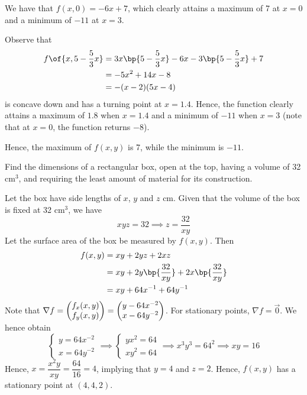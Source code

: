 \documentclass{echw}
\begin{document}
         We have that $f(x, 0) = -6x + 7$, which clearly attains a maximum of 7 at $x = 0$ and a minimum of $-11$ at $x = 3$.

         Observe that
        \begin{align*}
            f\of{x, 5 - \dfrac53 x} &= 3x\bp{5 - \dfrac53 x} - 6x - 3\bp{5 - \dfrac53 x} + 7\\
            &= -5x^2 + 14x - 8\\
            &= -(x-2)(5x-4)
        \end{align*}
        is concave down and has a turning point at $x = 1.4$. Hence, the function clearly attains a maximum of $1.8$ when $x = 1.4$ and a minimum of $-11$ when $x = 3$ (note that at $x = 0$, the function returns $-8$). 

        Hence, the maximum of $f(x, y)$ is 7, while the minimum is $-11$.


    \problem{}
        Find the dimensions of a rectangular box, open at the top, having a volume of 32 cm$^3$, and requiring the least amount of material for its construction.

    \solution
        Let the box have side lengths of $x$, $y$ and $z$ cm. Given that the volume of the box is fixed at 32 cm$^3$, we have \[xyz = 32 \implies z = \dfrac{32}{xy}\] Let the surface area of the box be measured by $f(x, y)$. Then
        \begin{align*}
            f(x, y) &= xy + 2yz + 2xz\\
            &= xy + 2y\bp{\dfrac{32}{xy}} + 2x\bp{\dfrac{32}{xy}}\\
            &= xy + 64x^{-1} + 64y^{-1}
        \end{align*}
        Note that $\nabla f = \begin{pmatrix} f_x(x, y) \\ f_y(x, y) \end{pmatrix} = \begin{pmatrix} y-64x^{-2} \\ x - 64y^{-2} \end{pmatrix}$. For stationary points, $\nabla f = \vec 0$. We hence obtain
        \[
            \begin{cases}
                y = 64x^{-2}\\
                x = 64y^{-2}
            \end{cases} \implies
            \begin{cases}
                yx^2 = 64\\
                xy^2 = 64
            \end{cases}
            \implies x^3y^3 = 64^2 \implies xy = 16
        \]
        Hence, $x = \dfrac{x^2y}{xy} = \dfrac{64}{16} = 4$, implying that $y = 4$ and $z = 2$. Hence, $f(x, y)$ has a stationary point at $(4, 4, 2)$. 
        
\end{document}
